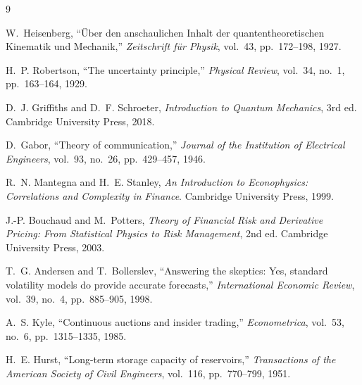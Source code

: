 \documentclass[11pt]{article}
\begin{document}
\begin{thebibliography}{9}

W.~Heisenberg, ``\"{U}ber den anschaulichen Inhalt der quantentheoretischen Kinematik und Mechanik,'' \textit{Zeitschrift f\"{u}r Physik}, vol.~43, pp.~172--198, 1927.

H.~P. Robertson, ``The uncertainty principle,'' \textit{Physical Review}, vol.~34, no.~1, pp.~163--164, 1929.

D.~J. Griffiths and D.~F. Schroeter, \textit{Introduction to Quantum Mechanics}, 3rd ed. Cambridge University Press, 2018.

D.~Gabor, ``Theory of communication,'' \textit{Journal of the Institution of Electrical Engineers}, vol.~93, no.~26, pp.~429--457, 1946.

R.~N. Mantegna and H.~E. Stanley, \textit{An Introduction to Econophysics: Correlations and Complexity in Finance}. Cambridge University Press, 1999.

J.-P. Bouchaud and M.~Potters, \textit{Theory of Financial Risk and Derivative Pricing: From Statistical Physics to Risk Management}, 2nd ed. Cambridge University Press, 2003.

T.~G. Andersen and T.~Bollerslev, ``Answering the skeptics: Yes, standard volatility models do provide accurate forecasts,'' \textit{International Economic Review}, vol.~39, no.~4, pp.~885--905, 1998.

A.~S. Kyle, ``Continuous auctions and insider trading,'' \textit{Econometrica}, vol.~53, no.~6, pp.~1315--1335, 1985.

H.~E. Hurst, ``Long-term storage capacity of reservoirs,'' \textit{Transactions of the American Society of Civil Engineers}, vol.~116, pp.~770--799, 1951.

\end{thebibliography}
\end{document}

